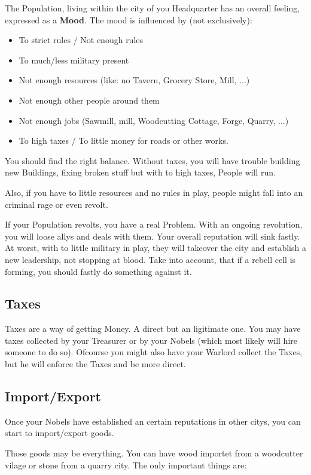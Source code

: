 The Population, living within the city of you Headquarter has an overall feeling, expressed as a \textbf{Mood}. The mood is influenced by (not exclusively):
\begin{itemize}
\item To strict rules / Not enough rules
\item To much/less military present
\item Not enough resources (like: no Tavern, Grocery Store, Mill, ...)
\item Not enough other people around them
\item Not enough jobs (Sawmill, mill, Woodcutting Cottage, Forge, Quarry, ...)
\item To high taxes / To little money for roads or other works.
\end{itemize}

You should find the right balance. Without taxes, you will have trouble building new Buildings, fixing broken stuff but with to high taxes, People will run.

Also, if you have to little resources and no rules in play, people might fall into an criminal rage or even revolt. 

If your Population revolts, you have a real Problem. With an ongoing revolution, you will loose allys and deals with them. Your overall reputation will sink fastly. At worst, with to little military in play, they will takeover the city and establish a new leadership, not stopping at blood. Take into account, that if a rebell cell is forming, you should fastly do something against it.

\subsection{Taxes}

Taxes are a way of getting Money. A direct but an ligitimate one. You may have taxes collected by your Treasurer or by your Nobels (which most likely will hire someone to do so). Ofcourse you might also have your Warlord collect the Taxes, but he will enforce the Taxes and be more direct.

\subsection{Import/Export}

Once your Nobels have established an certain reputations in other citys, you can start to import/export goods.

Those goods may be everything. You can have wood importet from a woodcutter vilage or stone from a quarry city. The only important things are:

